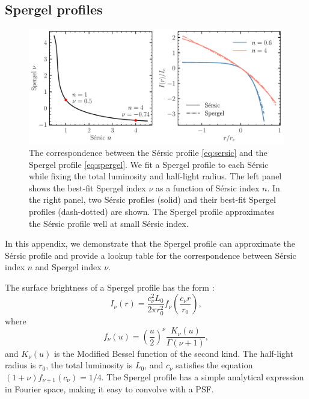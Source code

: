 \documentclass[twocolumn,astrosymb,twocolappendix]{aastex631}
\newcommand{\sersic}{S\'ersic}
\begin{document}
\begin{CJK*}{UTF8}{gbsn}
\section{Spergel profiles}\label{ap:spergel}
\begin{figure}[htbp!]
	\vbox{ 
		\centering
		\includegraphics[width=0.75\linewidth]{spergel_sersic_calib.pdf}
	}
    \caption{The correspondence between the \sersic{} profile \eqref{eq:sersic} and the Spergel profile \eqref{eq:spergel}. We fit a Spergel profile to each \sersic{} while fixing the total luminosity and half-light radius. The left panel shows the best-fit Spergel index $\nu$ as a function of \sersic{} index $n$. In the right panel, two \sersic{} profiles (solid) and their best-fit Spergel profiles (dash-dotted) are shown. The Spergel profile approximates the \sersic{} profile well at small \sersic{} index.  
    }
    \label{fig:spgl_calib}
\end{figure}

In this appendix, we demonstrate that the Spergel profile can approximate the \sersic{} profile and provide a lookup table for the correspondence between \sersic{} index $n$ and Spergel index $\nu$.

The surface brightness of a Spergel profile has the form \citep{Spergel2010}:
\begin{equation}
    \label{eq:spergel}
    I_\nu(r) = \frac{c_{\nu}^{2} L_{0}}{2\pi r_{0}^{2}} f_{\nu}\left(\frac{c_{\nu} r}{r_{0}}\right),
\end{equation}
where 
\begin{equation}
    f_{\nu}(u)=\left(\frac{u}{2}\right)^{\nu} \frac{K_{\nu}(u)}{\Gamma(\nu+1)},
\end{equation}
and $K_\nu(u)$ is the Modified Bessel function of the second kind. The half-light radius is $r_0$, the total luminosity is $L_0$, and $c_\nu$ satisfies the equation $(1 + \nu)f_{\nu + 1}(c_\nu) = 1/4$. The Spergel profile has a simple analytical expression in Fourier space, making it easy to convolve with a PSF.


\end{CJK*}
\end{document}
